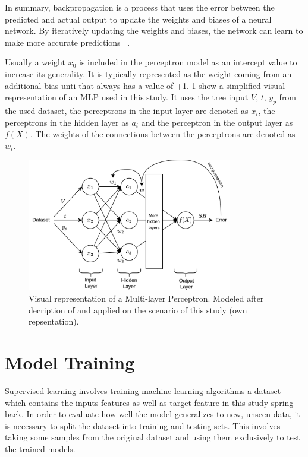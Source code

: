 {In summary, backpropagation is a process that uses the error between the predicted and actual output to update the
weights and biases of a neural network.
By iteratively updating the weights and biases, the network can learn to make more accurate predictions
~\cite[p. 53--57]{nielsen_neuralnetworksdeep_2015}.

Usually a weight $x_0$ is included in the perceptron model as an intercept value to increase its generality.
It is typically represented as the weight coming from an additional bias unti that always has a value of +1.
\cref{fig:mlp-example} show a simplified visual representation of an MLP used in this study.
It uses the tree input $V$, $t$, $y_p$ from the used dataset, the perceptrons in the input layer are denoted as $x_i$,
the perceptrons in the hidden layer as $a_i$ and the perceptron in the output layer as $f(X)$.
The weights of the connections between the perceptrons are denoted as $w_i$.

\begin{figure}[h]
    \begin{tcolorbox}[arc=0pt,boxrule=0.5pt]
        \centering
        \includegraphics[width=0.8\textwidth]{chap4/images/mlp_example}
    \end{tcolorbox}
    \caption{Visual representation of a Multi-layer Perceptron. Modeled after decription of
    \cite{nielsen_neuralnetworksdeep_2015} and applied on the scenario of this study
        (own repsentation). }
    \label{fig:mlp-example}
\end{figure}


\section{Model Training}\label{sec:model-training}
Supervised learning involves training machine learning algorithms a dataset which contains the inputs features as well
as target feature in this study spring back.
In order to evaluate how well the model generalizes to new, unseen data, it is necessary to
split the dataset into training and testing sets.
This involves taking some samples from the original dataset and using them exclusively to test the trained models.

}
